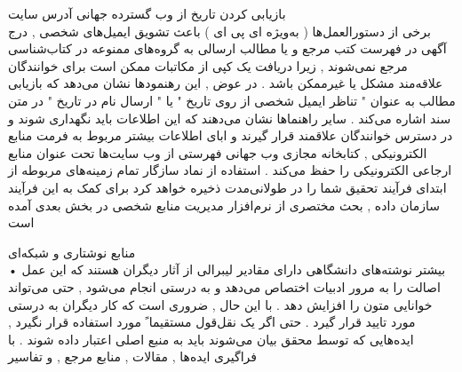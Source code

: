 \documentclass[xcolor=dvipsnames, professionalfont]{beamer}
\begin{document}
\begin{frame}
	 بازیابی کردن تاریخ از وب گسترده جهانی آدرس سایت \\
	برخی از دستورالعمل‌ها ( به‌ویژه ای پی ای ) باعث تشویق ایمیل‌های شخصی , درج آگهی در فهرست کتب مرجع و یا مطالب ارسالی به گروه‌های ممنوعه در کتاب‌شناسی مرجع نمی‌شوند , زیرا دریافت یک کپی از مکاتبات ممکن است برای خوانندگان علاقه‌مند مشکل یا غیرممکن باشد . در عوض , این رهنمودها نشان می‌دهد که بازیابی مطالب به عنوان " تناظر ایمیل شخصی از روی تاریخ " یا " ارسال نام در تاریخ " در متن سند اشاره می‌کند . سایر راهنماها نشان می‌دهند که این اطلاعات باید نگهداری شوند و در دسترس خوانندگان علاقمند قرار گیرند و ابای اطلاعات بیشتر مربوط به فرمت منابع الکترونیکی , کتابخانه مجازی وب جهانی فهرستی از وب سایت‌ها تحت عنوان منابع ارجاعی الکترونیکی را حفظ می‌کند . استفاده از نماد سازگار تمام زمینه‌های مربوطه از ابتدای فرآیند تحقیق شما را در طولانی‌مدت ذخیره خواهد کرد  برای کمک به این فرآیند سازمان داده , بحث مختصری از نرم‌افزار مدیریت منابع شخصی در بخش بعدی آمده‌ است
	
\end{frame}	

\begin{frame}
	منابع نوشتاری و شبکه‌ای \\
	•	بیشتر نوشته‌های دانشگاهی دارای مقادیر لیبرالی از آثار دیگران هستند که این عمل اصالت را به مرور ادبیات اختصاص می‌دهد و به درستی انجام می‌شود , حتی می‌تواند خوانایی متون را افزایش دهد . با این حال , ضروری است که کار دیگران به درستی مورد تایید قرار گیرد . حتی اگر یک نقل‌قول مستقیما ً مورد استفاده قرار نگیرد , ایده‌هایی که توسط محقق بیان می‌شوند باید به منبع اصلی اعتبار داده شوند . با فراگیری ایده‌ها , مقالات , منابع مرجع , و تفاسیر
	
\end{frame}	
	
\end{document}
